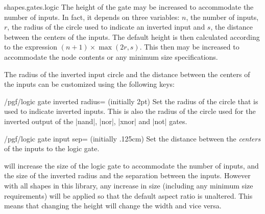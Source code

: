 \begin{pgflibrary}{shapes.gates.logic}
    The height of the gate may be increased to accommodate the number of
    inputs. In fact, it depends on three variables: $n$, the number of inputs,
    $r$, the radius of the circle used to indicate an inverted input and $s$,
    the distance between the centers of the inputs. The default height is then
    calculated according to the expression $(n+1)\times\max(2r,s)$. This then
    may be increased to accommodate the node contents or any minimum size
    specifications.

    The radius of the inverted input circle and the distance between the
    centers of the inputs can be customized using the following keys:

    \begin{key}{/pgf/logic gate inverted radius= (initially 2pt)}
        Set the radius of the circle that is used to indicate inverted inputs.
        This is also the radius of the circle used for the inverted output of
        the |nand|, |nor|, |xnor| and |not| gates.
\begin{codeexample}[preamble={\usetikzlibrary{circuits.logic.CDH}}]
\end{codeexample}
    \end{key}

    \begin{key}{/pgf/logic gate input sep= (initially .125cm)}
        Set the distance between the \emph{centers} of the inputs to the logic
        gate.
\begin{codeexample}[preamble={\usetikzlibrary{circuits.logic.IEC}}]
\end{codeexample}
    \end{key}

    \pgfname{} will increase the size of the logic gate to accommodate the
    number of inputs, and the size of the inverted radius and the separation
    between the inputs. However with all shapes in this library, any increase
    in size (including any minimum size requirements) will be applied so that
    the default aspect ratio is unaltered. This means that changing the height
    will change the width and vice versa.
\end{pgflibrary}


